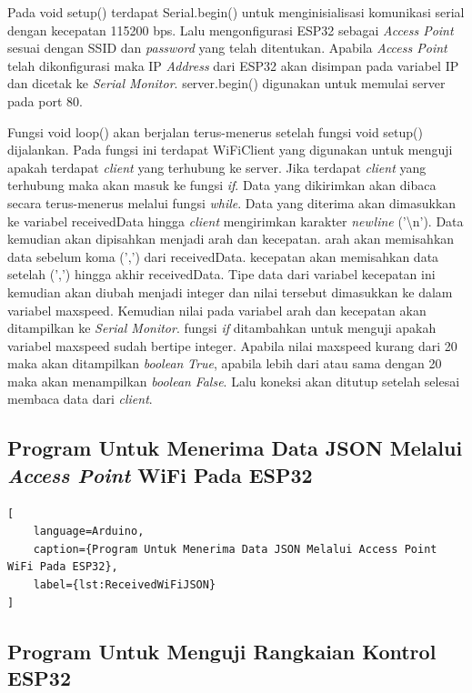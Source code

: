 Pada void setup() terdapat Serial.begin() untuk menginisialisasi komunikasi serial dengan kecepatan 115200 bps. Lalu mengonfigurasi ESP32 sebagai \emph{Access Point} sesuai dengan SSID dan \emph{password} yang telah ditentukan. Apabila \emph{Access Point} telah dikonfigurasi maka IP \emph{Address} dari ESP32 akan disimpan pada variabel IP dan dicetak ke \emph{Serial Monitor}. server.begin() digunakan untuk memulai server pada port 80.

Fungsi void loop() akan berjalan terus-menerus setelah fungsi void setup() dijalankan. Pada fungsi ini terdapat WiFiClient yang digunakan untuk menguji apakah terdapat \emph{client} yang terhubung ke server. Jika terdapat \emph{client} yang terhubung maka akan masuk ke fungsi \emph{if}. Data yang dikirimkan akan dibaca secara terus-menerus melalui fungsi \emph{while}. Data yang diterima akan dimasukkan ke variabel receivedData hingga \emph{client} mengirimkan karakter \emph{newline} ('\textbackslash n'). Data kemudian akan dipisahkan menjadi arah dan kecepatan. arah akan memisahkan data sebelum koma (',') dari receivedData. kecepatan akan memisahkan data setelah (',') hingga akhir receivedData. Tipe data dari variabel kecepatan ini kemudian akan diubah menjadi integer dan nilai tersebut dimasukkan ke dalam variabel maxspeed. Kemudian nilai pada variabel arah dan kecepatan akan ditampilkan ke \emph{Serial Monitor}. fungsi \emph{if} ditambahkan untuk menguji apakah variabel maxspeed sudah bertipe integer. Apabila nilai maxspeed kurang dari 20 maka akan ditampilkan \emph{boolean} \emph{True}, apabila lebih dari atau sama dengan 20 maka akan menampilkan \emph{boolean} \emph{False}. Lalu koneksi akan ditutup setelah selesai membaca data dari \emph{client}.

\subsection{Program Untuk Menerima Data JSON Melalui \emph{Access Point} WiFi Pada ESP32}

\begin{lstlisting}[
    language=Arduino,
    caption={Program Untuk Menerima Data JSON Melalui Access Point WiFi Pada ESP32},
    label={lst:ReceivedWiFiJSON}
]

\end{lstlisting}

\subsection{Program Untuk Menguji Rangkaian Kontrol ESP32}

